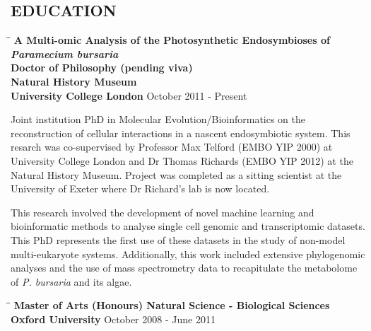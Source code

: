\documentclass{res}
\begin{document}
\begin{resume}
        
\section{EDUCATION}          

\vspace{-0.05in}
\begin{tabbing}
   \hspace{2in}\= \hspace{2.6in}\= \kill 
   {\bf A Multi-omic Analysis of the Photosynthetic Endosymbioses of \textit{Paramecium bursaria}}\\
    {\bf Doctor of Philosophy (pending viva)}\\ 
    {\bf Natural History Museum}\\
    {\bf University College London
    } \>      \>October 2011 - Present\\

   \end{tabbing}\vspace{-20pt}  
   
   Joint institution PhD in Molecular Evolution/Bioinformatics on the reconstruction of cellular interactions in a nascent endosymbiotic system.  This resarch was co-supervised by Professor Max Telford (EMBO YIP 2000) at University College London and Dr Thomas Richards (EMBO YIP 2012) at the Natural History Museum.  Project was completed as a sitting scientist at the University of Exeter where Dr Richard's lab is now located.

   This research involved the development of novel machine learning and bioinformatic methods
   to analyse single cell genomic and transcriptomic datasets.  
   This PhD represents the first use of these datasets in the study of non-model multi-eukaryote systems.
   Additionally, this work included extensive phylogenomic analyses and the use of 
   mass spectrometry data
   to recapitulate the metabolome of \textit{P. bursaria} and its algae. 

\vspace{-0.1in}
 \begin{tabbing}
   \hspace{2in}\= \hspace{2.6in}\= \kill 
     {\bf Master of Arts (Honours) Natural Science - Biological Sciences}\\
    {\bf Oxford University
    } \>      \>October 2008 - June 2011\\
                          


\end{tabbing}
\end{resume}
\end{document}
